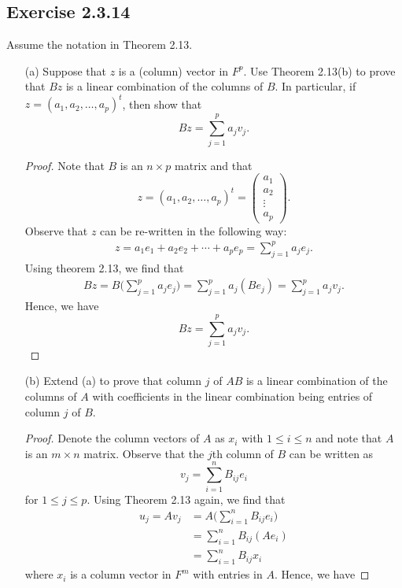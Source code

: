\subsection*{Exercise 2.3.14} Assume the notation in Theorem 2.13.
\begin{enumerate}
    \item[(a)] Suppose that \( z  \) is a (column) vector in \( F^{p} \). Use Theorem 2.13(b) to prove that \( Bz  \) is a linear combination of the columns of \( B  \). In particular, if \( z = ({a}_{1}, {a}_{2}, \dots, {a}_{p})^{t} \), then show that  
        \[  Bz = \sum_{ j=1  }^{ p  } {a}_{j} {v}_{j}. \]
        \begin{proof}
        Note that \( B  \) is an \( n \times  p  \) matrix and that 
        \[  z = ({a}_{1}, {a}_{2}, \dots, {a}_{p})^{t} = \begin{pmatrix}
            {a}_{1} \\
            {a}_{2} \\
            \vdots \\
            {a}_{p}
        \end{pmatrix}. \]
        Observe that \( z  \) can be re-written in the following way:
        \begin{align*}
            z = {a}_{1} {e}_{1} + {a}_{2} {e}_{2} + \cdots + {a}_{p} {e}_{p}  
              = \sum_{ j=1  }^{ p  } {a}_{j } {e}_{j }.
        \end{align*}
        Using theorem 2.13, we find that
        \begin{align*}
            Bz = B \Big( \sum_{ j=1  }^{ p } {a}_{j} {e}_{j} \Big)
               = \sum_{ j=1  }^{ p } {a}_{j} (B {e}_{j}) 
               =  \sum_{ j=1  }^{ p } {a}_{j} {v}_{j}.
        \end{align*}
        Hence, we have
        \[  Bz = \sum_{ j=1  }^{ p } {a}_{j} {v}_{j}. \]


        \end{proof}
    \item[(b)] Extend (a) to prove that column \( j  \) of \( AB  \) is a linear combination of the columns of \( A  \) with coefficients in the linear combination being entries of column \( j  \) of \(  B \). 
        \begin{proof}
        Denote the column vectors of \( A  \) as \( {x}_{i} \) with \( 1 \leq i \leq n  \) and note that \( A  \) is an \( m \times n  \) matrix. Observe that the \( j \)th column of \( B  \) can be written as
        \[  {v}_{j} = \sum_{ i=1  }^{ n } {B}_{ij} {e}_{i} \]
        for \( 1 \leq j \leq p  \). Using Theorem 2.13 again, we find that
        \begin{align*}
            {u}_{j}  = A {v}_{j}  &= A \Big( \sum_{ i=1  }^{ n } {B}_{ij} {e}_{i} \Big) \\
                                  &= \sum_{ i=1  }^{ n } {B}_{ij} ({Ae}_{i}) \\
                                  &= \sum_{ i=1  }^{ n } {B}_{ij} {x}_{i}
        \end{align*}
        where \( {x}_{i}  \) is a column vector in \( F^{m} \) with entries in \(  A  \). Hence, we have


\end{proof}
\end{enumerate}
